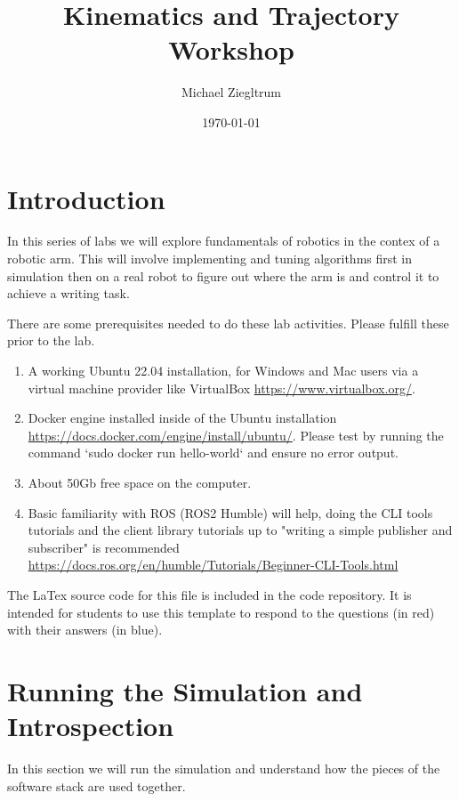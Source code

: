 \documentclass[11pt,a4paper]{article}
\begin{document}

\title{\bfseries\huge Kinematics and Trajectory Workshop}
\author{Michael Ziegltrum}
\date{\today}
\maketitle

\section{Introduction}

In this series of labs we will explore fundamentals of robotics in the contex of a robotic arm. This will involve implementing and tuning algorithms first in simulation then on a real robot to figure out where the arm is and control it to achieve a writing task. 

There are some prerequisites needed to do these lab activities. Please fulfill these prior to the lab.

\begin{enumerate}
    \item{A working Ubuntu 22.04 installation, for Windows and Mac users via a virtual machine provider like VirtualBox \url{https://www.virtualbox.org/}.}
    \item{Docker engine installed inside of the Ubuntu installation \url{https://docs.docker.com/engine/install/ubuntu/}. Please test by running the command `sudo docker run hello-world` and ensure no error output.}
    \item{About 50Gb free space on the computer.}
    \item{Basic familiarity with ROS (ROS2 Humble) will help, doing the CLI tools tutorials and the client library tutorials up to "writing a simple publisher and subscriber" is recommended \url{https://docs.ros.org/en/humble/Tutorials/Beginner-CLI-Tools.html}}
\end{enumerate}

The LaTex source code for this file is included in the code repository. It is intended for students to use this template to respond to the questions (in red) with their answers (in blue).

\section{Running the Simulation and Introspection}

In this section we will run the simulation and understand how the pieces of the software stack are used together.
\end{document}
